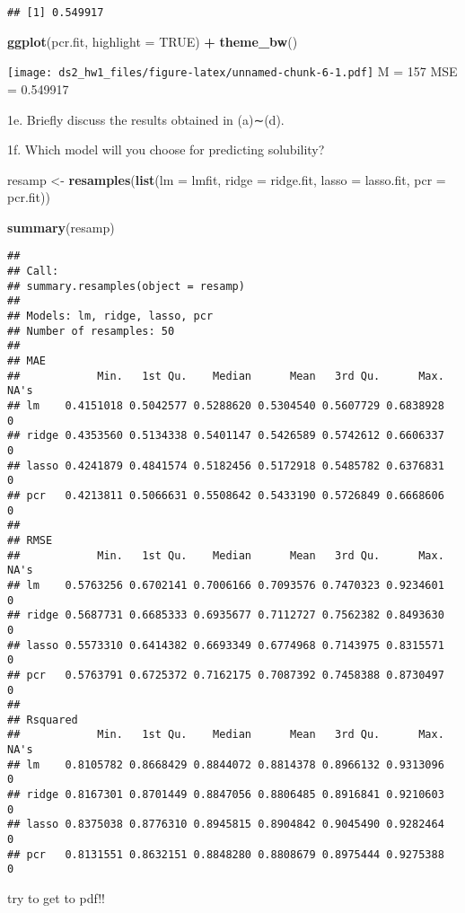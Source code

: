 \documentclass[]{article}
\newenvironment{Shaded}{\begin{snugshade}}{\end{snugshade}}
\newcommand{\DataTypeTok}[1]{\textcolor[rgb]{0.13,0.29,0.53}{#1}}
\newcommand{\KeywordTok}[1]{\textcolor[rgb]{0.13,0.29,0.53}{\textbf{#1}}}
\newcommand{\NormalTok}[1]{#1}
\newcommand{\OperatorTok}[1]{\textcolor[rgb]{0.81,0.36,0.00}{\textbf{#1}}}
\newcommand{\OtherTok}[1]{\textcolor[rgb]{0.56,0.35,0.01}{#1}}
\newcommand{\StringTok}[1]{\textcolor[rgb]{0.31,0.60,0.02}{#1}}
\begin{document}
\begin{verbatim}
## [1] 0.549917
\end{verbatim}

\begin{Shaded}
\begin{Highlighting}[]
\KeywordTok{ggplot}\NormalTok{(pcr.fit, }\DataTypeTok{highlight =} \OtherTok{TRUE}\NormalTok{) }\OperatorTok{+}\StringTok{ }\KeywordTok{theme_bw}\NormalTok{()}
\end{Highlighting}
\end{Shaded}

\texttt{[image: ds2\_hw1\_files/figure-latex/unnamed-chunk-6-1.pdf]} M =
157 MSE = 0.549917

1e. Briefly discuss the results obtained in (a)∼(d).

1f. Which model will you choose for predicting solubility?

\begin{Shaded}
\begin{Highlighting}[]
\NormalTok{resamp <-}\StringTok{ }\KeywordTok{resamples}\NormalTok{(}\KeywordTok{list}\NormalTok{(}\DataTypeTok{lm =}\NormalTok{ lmfit,}
                         \DataTypeTok{ridge =}\NormalTok{ ridge.fit, }
                         \DataTypeTok{lasso =}\NormalTok{ lasso.fit, }
                         \DataTypeTok{pcr =}\NormalTok{ pcr.fit))}

\KeywordTok{summary}\NormalTok{(resamp)}
\end{Highlighting}
\end{Shaded}

\begin{verbatim}
## 
## Call:
## summary.resamples(object = resamp)
## 
## Models: lm, ridge, lasso, pcr 
## Number of resamples: 50 
## 
## MAE 
##            Min.   1st Qu.    Median      Mean   3rd Qu.      Max. NA's
## lm    0.4151018 0.5042577 0.5288620 0.5304540 0.5607729 0.6838928    0
## ridge 0.4353560 0.5134338 0.5401147 0.5426589 0.5742612 0.6606337    0
## lasso 0.4241879 0.4841574 0.5182456 0.5172918 0.5485782 0.6376831    0
## pcr   0.4213811 0.5066631 0.5508642 0.5433190 0.5726849 0.6668606    0
## 
## RMSE 
##            Min.   1st Qu.    Median      Mean   3rd Qu.      Max. NA's
## lm    0.5763256 0.6702141 0.7006166 0.7093576 0.7470323 0.9234601    0
## ridge 0.5687731 0.6685333 0.6935677 0.7112727 0.7562382 0.8493630    0
## lasso 0.5573310 0.6414382 0.6693349 0.6774968 0.7143975 0.8315571    0
## pcr   0.5763791 0.6725372 0.7162175 0.7087392 0.7458388 0.8730497    0
## 
## Rsquared 
##            Min.   1st Qu.    Median      Mean   3rd Qu.      Max. NA's
## lm    0.8105782 0.8668429 0.8844072 0.8814378 0.8966132 0.9313096    0
## ridge 0.8167301 0.8701449 0.8847056 0.8806485 0.8916841 0.9210603    0
## lasso 0.8375038 0.8776310 0.8945815 0.8904842 0.9045490 0.9282464    0
## pcr   0.8131551 0.8632151 0.8848280 0.8808679 0.8975444 0.9275388    0
\end{verbatim}

try to get to pdf!!
\end{document}
